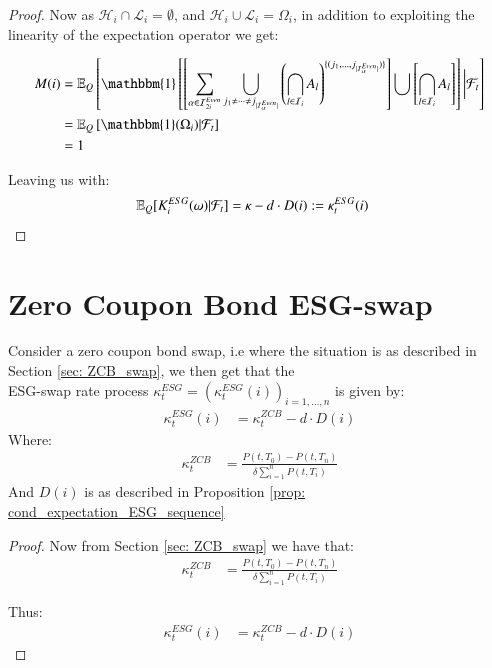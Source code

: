 \begin{proof}
Now as $\mathcal{H}_{i}\cap \mathcal{L}_{i} = \emptyset$, 
and $\mathcal{H}_{i}\cup \mathcal{L}_{i} = \Omega_{i}$, in addition to exploiting the linearity of the expectation operator we get:

\begin{align*}
M(i) 
&= 
\E_{Q}\left[
\mathbbm{1}\left[
\left[
\sum_{\alpha \in \mathcal{I}_{2i}^{Even}}
\bigcup_{
j_{1} \neq \dots \neq j_{|\mathcal{I}_{\alpha}^{Even}|}
}
\left(
\bigcap_{l \in \mathcal{I}_{i}}A_{l}
\right)^{
\{
(j_{1}, \dots, j_{|\mathcal{I}_{\alpha}^{Even}|})
\}
}
\right]
\bigcup
\left[
\bigcap_{l \in \mathcal{I}_{i}}A_{l}
\right]
\right]
\bigg{|}\F_{t}
\right] \\ 
&= 
\E_{Q}\left[
\mathbbm{1}(\Omega_{i})|\F_{t}
\right] \\ 
&= 
1
\end{align*}

Leaving us with: 
\begin{align*}
\mathbb{E}_{Q}[K_{i}^{ESG}(\omega)|\mathcal{F}_{t}] &= 
\kappa - d\cdot D(i) := \kappa_{t}^{ESG}(i)
\end{align*}


\end{proof}


\section{Zero Coupon Bond ESG-swap}

\begin{proposition}
Consider a zero coupon bond swap, i.e where the situation is as described in Section \cref{sec: ZCB_swap}, we then get that the
\\ 
ESG-swap rate process $\kappa^{ESG}_{t} = (\kappa_{t}^{ESG}(i))_{i=1, \dots, n}$ is given by: 
\begin{align*}
\kappa_{t}^{ESG}(i) &= \kappa_{t}^{ZCB} -d\cdot D(i)    
\end{align*}
Where: 
\begin{align*}
\kappa_{t}^{ZCB} &=  
\frac{
P(t,T_{0}) - P(t,T_{n})
}{
\delta\sum_{i=1}^{n}P(t,T_{i})
}
\end{align*}
And $D(i)$ is as described in Proposition \ref{prop: cond_expectation_ESG_sequence}

\end{proposition}

\begin{proof}
Now from Section \cref{sec: ZCB_swap} we have that: 
\begin{align*}
\kappa_{t}^{ZCB} &=  
\frac{
P(t,T_{0}) - P(t,T_{n})
}{
\delta\sum_{i=1}^{n}P(t,T_{i})
}    
\end{align*}

Thus: 
\begin{align*}
\kappa_{t}^{ESG}(i) &= \kappa_{t}^{ZCB} -d\cdot D(i)    
\end{align*}
\end{proof}


